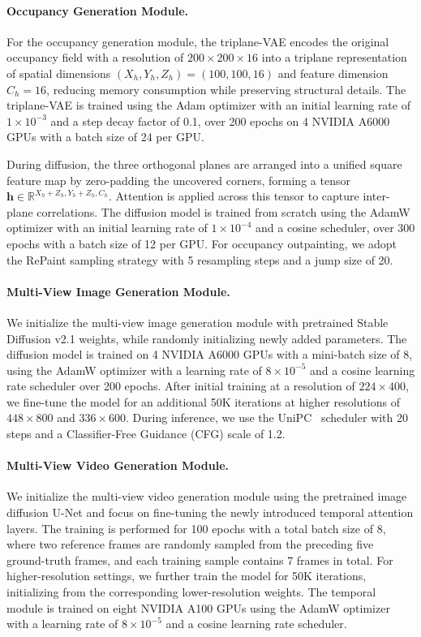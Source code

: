 \paragraph{Occupancy Generation Module.}
For the occupancy generation module, the triplane-VAE encodes the original occupancy field with a resolution of $200 \times 200 \times 16$ into a triplane representation of spatial dimensions $(X_h, Y_h, Z_h) = (100, 100, 16)$ and feature dimension $C_h = 16$, reducing memory consumption while preserving structural details. 
The triplane-VAE is trained using the Adam optimizer with an initial learning rate of $1 \times 10^{-3}$ and a step decay factor of 0.1, over 200 epochs on 4 NVIDIA A6000 GPUs with a batch size of 24 per GPU.

During diffusion, the three orthogonal planes are arranged into a unified square feature map by zero-padding the uncovered corners, forming a tensor $\mathbf{h} \in \mathbb{R}^{X_h+Z_h, Y_h+Z_h, C_h}$. Attention is applied across this tensor to capture inter-plane correlations.
The diffusion model is trained from scratch using the AdamW optimizer with an initial learning rate of $1 \times 10^{-4}$ and a cosine scheduler, over 300 epochs with a batch size of 12 per GPU.
For occupancy outpainting, we adopt the RePaint sampling strategy with 5 resampling steps and a jump size of 20.

\paragraph{Multi-View Image Generation Module.}
We initialize the multi-view image generation module with pretrained Stable Diffusion v2.1 weights, while randomly initializing newly added parameters. The diffusion model is trained on 4 NVIDIA A6000 GPUs with a mini-batch size of 8, using the AdamW optimizer with a learning rate of $8 \times 10^{-5}$ and a cosine learning rate scheduler over 200 epochs. After initial training at a resolution of $224 \times 400$, we fine-tune the model for an additional 50K iterations at higher resolutions of $448 \times 800$ and $336 \times 600$. During inference, we use the UniPC~\cite{UniPC} scheduler with 20 steps and a Classifier-Free Guidance (CFG) scale of 1.2.

\paragraph{Multi-View Video Generation Module.}
We initialize the multi-view video generation module using the pretrained image diffusion U-Net and focus on fine-tuning the newly introduced temporal attention layers. The training is performed for 100 epochs with a total batch size of 8, where two reference frames are randomly sampled from the preceding five ground-truth frames, and each training sample contains 7 frames in total. For higher-resolution settings, we further train the model for 50K iterations, initializing from the corresponding lower-resolution weights. The temporal module is trained on eight NVIDIA A100 GPUs using the AdamW optimizer with a learning rate of $8 \times 10^{-5}$ and a cosine learning rate scheduler.

